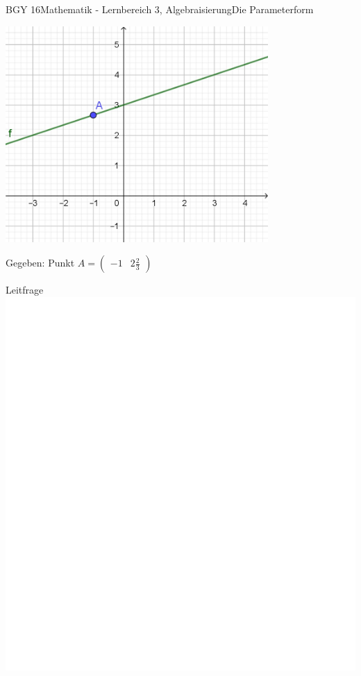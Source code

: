 \documentclass[oneside,openany,headings=optiontotoc,11pt,numbers=noenddot]{scrreprt}
\begin{document}
	\begin{worksheet}{BGY 16}{Mathematik - Lernbereich 3, Algebraisierung}{Die Parameterform}
				
		\begin{framed}
			\noindent
			\begin{center}
				\includegraphics[width=0.75\textwidth]{Bilder/Gerade.jpg}\\
			\end{center}
			Gegeben: Punkt \(A = \begin{pmatrix}
			-1 & 2\frac{2}{3}
			\end{pmatrix}\)
		\end{framed}
		\begin{framed}
			\noindent
			\tiny{\color{codegray}Leitfrage}\\
			\includegraphics[scale=0.05]{../empty.jpg}

\end{framed}
\end{worksheet}
\end{document}
